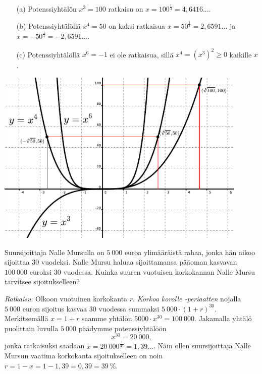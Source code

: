 \begin{esimerkki}
\begin{enumerate}
\item[(a)]
Potenssiyhtälön $x^3 = 100$ ratkaisu on $x=100^{\frac{1}{3}}=4{,}6416...$.
\item[(b)]
Potenssiyhtälöllä $x^4=50$ on kaksi ratkaisua $x=50^{\frac{1}{4}}=2{,}6591...$ ja $x=-50^{\frac{1}{4}}=-2{,}6591...$.
\item[(c)] 
Potenssiyhtälöllä $x^6 = -1$ ei ole ratkaisua, sillä $x^4 = (x^3)^2 \ge 0$ kaikille $x$.
\end{enumerate}

\begin{center}
\includegraphics[width=12cm]{02-yhtalot/kuvia/xpot346.pdf}
\end{center}
\end{esimerkki}


\begin{esimerkki}
Suursijoittaja Nalle Mursulla on $5\ 000$ euroa ylimääräistä rahaa, jonka hän aikoo sijoittaa $30$ vuodeksi.  Nalle Mursu haluaa sijoittamansa pääoman kasvavan $100\ 000$ euroksi $30$ vuodessa.  Kuinka suuren vuotuisen korkokannan Nalle Mursu tarvitsee sijoitukselleen?

\emph{Ratkaisu}:  Olkoon vuotuinen korkokanta $r$. \emph{Korkoa korolle -periaatten} nojalla $5\ 000$ euron sijoitus kasvaa $30$ vuodessa summaksi $5\ 000\cdot(1+r)^{30}$.  Merkitsemällä $x=1+r$ saamme yhtälön $5 000\cdot x^{30} = 100\ 000$.  Jakamalla yhtälö puolittain luvulla $5\ 000$ päädymme
potenssiyhtälöön 
$$
x^{30} = 20\ 000,
$$ 
jonka ratkaisuksi saadaan $x=20\ 000^{\frac{1}{30}} = 1{,}39...$. Näin
ollen suursijoittaja Nalle Mursun vaatima korkokanta sijoitukselleen on noin $r=1-x=1-1,39=0,39=39\ \%$.
\end{esimerkki}

